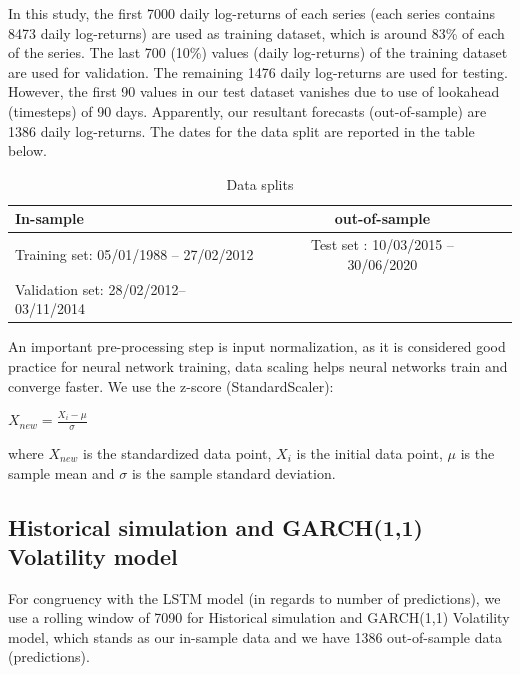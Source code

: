 \documentclass[a4paper,11pt,oneside]{book}
\begin{document}
In this study, the first 7000 daily log-returns of each series (each series contains 8473 daily log-returns) are used as training dataset, which is around 83\% of each of the series. The last 700 (10\%) values (daily log-returns) of the training dataset are used for validation. The remaining 1476 daily log-returns are used for testing. However, the first 90 values in our test dataset vanishes due to use of lookahead (timesteps) of 90 days. Apparently, our resultant forecasts (out-of-sample) are 1386 daily log-returns. The dates for the data split are reported in the table below.
\newline\newline
\begin{table}[!h]
	\centering
	\begin{tabular}{l|cl}
		\hline \hline
		In-sample
		& out-of-sample\\ \hline
		Training set: 05/01/1988 – 27/02/2012
		& Test set
		: 10/03/2015 – 30/06/2020
	 \\
		Validation set: 28/02/2012– 03/11/2014
		\\
		\hline \hline
	\end{tabular}
	\caption{Data splits}
	\label{firsttab}
\end{table}

An important pre-processing step is input normalization, as it is considered good practice for neural network training, data scaling helps neural networks train and converge faster. We use the z-score (StandardScaler): 

\begin{center}
	$X_{new} = \frac{X_{i}-\mu}{\sigma}$
\end{center}

where $X_{new}$ is the standardized data point, $X_{i}$ is the initial data point, $\mu$ is the sample mean and $\sigma$ is the sample standard deviation.


\subsection{Historical simulation and GARCH(1,1) Volatility model}
For congruency with the LSTM model (in regards to number of predictions), we use a rolling window of 7090 for Historical simulation and GARCH(1,1) Volatility model, which stands as our in-sample data and we have 1386 out-of-sample data (predictions).
\end{document}
